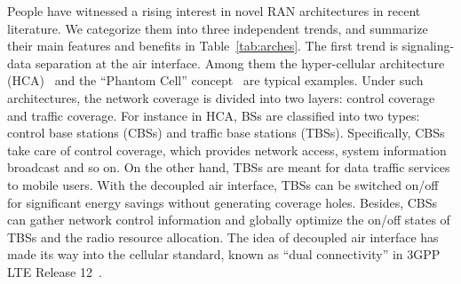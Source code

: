 \documentclass[12pt, draftclsnofoot,onecolumn]{IEEEtran}
\begin{document}
People have witnessed a rising interest in novel RAN architectures in recent literature.
We categorize them into three independent trends,
and summarize their main features and benefits in Table~\ref{tab:arches}.
The first trend is signaling-data separation at the air
interface. Among them the hyper-cellular architecture (HCA)~\cite{niu2012energy}
and the ``Phantom Cell'' concept~\cite{ishii2012novel} are typical examples.
Under such architectures, the network coverage is divided into two layers: control
coverage and traffic coverage. For instance in HCA, BSs are classified into two types: control base stations (CBSs)
and traffic base stations (TBSs).
Specifically, CBSs take care of control coverage, which provides network
access, system information broadcast and so on.
On the other hand, TBSs are meant for data traffic services to mobile users.
With the decoupled air interface, TBSs
can be switched on/off for significant energy savings without generating coverage holes.
Besides, CBSs can gather network control information and globally optimize the on/off states of TBSs and the radio resource allocation.
The idea of decoupled air interface has made its way into the cellular
standard, known as ``dual connectivity'' in 3GPP LTE Release 12~\cite{3gppdcr12}.
\end{document}
